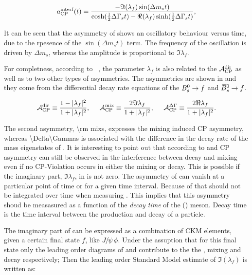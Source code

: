 \newcommand{\half}{\frac{1}{2}}
\begin{equation}
  \centering
  a_{\rm CP}^{\rm interf}(t) = \frac{ - \Im(\lambda_f) \sin(\Delta m_s t)} {\cosh(\half \Delta\Gamma_s t) - \Re(\lambda_f)\sinh(\half\Delta\Gamma_s t)},
\label{cpv_interf}
\end{equation}

\noindent It can be seen that the asymmetry of  shows an oscillatory behaviour versus time, due
to the rpesence of the $\sin(\Delta m_s t)$ term. The frequency of the oscillation is driven by $\Delta m_s$, whereas
the amplitude is proportional to $\Im\lambda_f$.

For completness, according to ~\cite{DeBruyn-thesis,jeroenThesis}, the parameter $\lambda_f$ is also related to the $\mathcal{A}_{\rm CP}^{\rm dir}$ as well as to two
other types of asymmetries. The asymmetries are shown in  and they come from the differential decay rate equations of the $B^0_s\rightarrow f$
 and $\kern 0.18em\overline{\kern -0.18em B}{}^0_s\rightarrow f$.

\begin{equation}
  \centering
  \Acp{\rm dir}      \equiv \frac{ 1-|\lambda_f|^2} {1 + |\lambda_f|^2},\;\;\;\;\;
  \Acp{\rm mix}      \equiv \frac{ 2 \Im\lambda_f} {1 + |\lambda_f|^2},\;\;\;\;\;
  \Acp{\Delta\Gamma} \equiv \frac{ 2 \Re\lambda_f} {1 + |\lambda_f|^2}.
\label{cp_asym_lambda}
\end{equation}

The second asymmetry, \Acp{\rm mix}, expresses the mixing induced CP asymmetry, whereas \Acp{\Delta\Gamma} is associated with the
difference in the decay rate of the mass eigenstates of . It is interesting to point out that according
to  and  CP asymmetry can still be observed in the interference between decay and
mixing even if no CP-Violation occurs in either the mixing or decay. This is possible if the imaginary part, $\Im\lambda_f$, in  is not zero.
The asymmetry of  can vanish at a particular point of time or for a given time interval. Because of that  should not
be integrated over time when measuring \phis. This implies that this asymmetry shoud be measasured as a function of the
{\it decay time} of the \Bs (\Bsb) meson. Decay time is the time interval between the production and decay of a particle.

The imaginary part of  can be expressed as a combination of CKM elements, given a certain final state $f$, like ${J\mskip -3mu/\mskip -2mu\psi\mskip 2mu}\phi$.
Under the assuption that for this final state only the leading order diagrams of  and  contribute to the
the \Bs, \Bsb mixing and decay respectively; Then the leading order Standard Model estimate of $\Im(\lambda_f)$ is written as:

